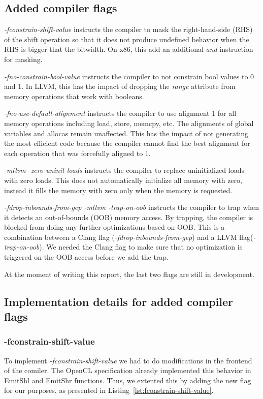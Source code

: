 \subsection{Added compiler flags}

\textit{-fconstrain-shift-value} instructs the compiler to mask the
right-hand-side (RHS) of the shift operation so that it does not produce
undefined behavior when the RHS is bigger that the bitwidth. On x86, this add an
additional \textit{and} instruction for masking.

\textit{-fno-constrain-bool-value} instructs the compiler to not constrain bool
values to 0 and 1. In LLVM, this has the impact of dropping the \textit{range}
attribute from memory operations that work with booleans.

\textit{-fno-use-default-alignment} instructs the compiler to use alignment 1
for all memory operations including load, store, memcpy, etc. The alignments of
global variables and allocas remain unaffected. This has the impact of not
generating the most efficient code because the compiler cannot find the best
alignment for each operation that was forcefully aligned to 1.

\textit{-mllvm -zero-uninit-loads} instructs the compiler to replace
uninitialized loads with zero loads. This does not automatically initialize all
memory with zero, instead it fills the memory with zero only when the memory is
requested.

\textit{-fdrop-inbounds-from-gep -mllvm -trap-on-oob} instructs the compiler to
trap when it detects an out-of-bounds (OOB) memory access. By trapping, the
compiler is blocked from doing any further optimizations based on OOB. This is a
combination between a Clang flag (\textit{-fdrop-inbounds-from-gep}) and a LLVM
flag(\textit{-trap-on-oob}). We needed the Clang flag to make sure that no
optimization is triggered on the OOB access before we add the trap.

At the moment of writing this report, the last two flags are still in
development.

\subsection{Implementation details for added compiler flags}

\subsubsection{-fconstrain-shift-value}
To implement \textit{-fconstrain-shift-value} we had to do modifications in the
frontend of the comiler. The OpenCL specification already implemented this
behavior in EmitShl and EmitShr functions. Thus, we extented this by adding the
new flag for our purposes, as presented in
Listing~\ref{lst:fconstrain-shift-value}.

